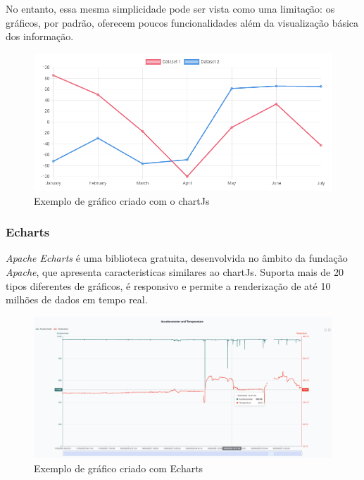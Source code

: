 No entanto, essa mesma simplicidade pode ser vista como uma limitação: os gráficos, por padrão, oferecem poucos funcionalidades além da visualização básica dos informação.

\begin{figure}[h!]
    \centering
    \includegraphics[width=\textwidth]{figs/chartJs.png}
    \caption[Gráfico chartJs]{Exemplo de gráfico criado com o chartJs}
    \label{fig:chartjs}
\end{figure}

\subsubsection{\textbf{Echarts}}\label{sec:echarts}
\textit{Apache Echarts} é uma biblioteca gratuita, desenvolvida no âmbito da fundação \textit{Apache}, que apresenta caracteristicas similares ao chartJs. Suporta mais de 20 tipos diferentes de gráficos, é responsivo e permite a renderização de até 10 milhões de dados em tempo real.

\begin{figure}[h!]
    \centering
    \includegraphics[width=\textwidth]{figs/echarts.png}
    \caption[Gráfico Apache Echarts]{Exemplo de gráfico criado com Echarts}
    \label{fig:echarts}
\end{figure}

